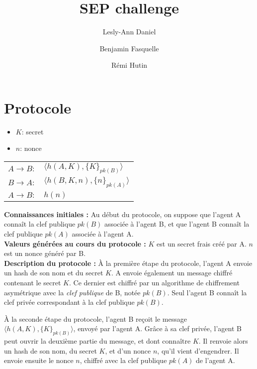 \documentclass[10pt,a4paper]{article}
\author{Lesly-Ann Daniel \and Benjamin Fasquelle \and Rémi Hutin}
\title{SEP challenge}
\begin{document}
\maketitle


\section{Protocole}

\begin{itemize}
\item $K$: secret
\item $n$: nonce
\end{itemize}

\begin{table}[!h]
\centering
\begin{tabular}{ll}
$A \rightarrow B:$ & $\langle h(A, K), \{K\}_{pk(B)} \rangle $ \\
$B \rightarrow A:$ & $\langle h(B, K, n), \{n\}_{pk(A)} \rangle $\\
$A \rightarrow B:$ & $h(n)$\\
\end{tabular}
\end{table}

\textbf{Connaissances initiales :} 
Au début du protocole, on suppose que l'agent A connaît la clef publique $pk(B)$ associée à l'agent B,
et que l'agent B connaît la clef publique $pk(A)$ associée à l'agent A. \\

\textbf{Valeurs générées au cours du protocole :} 
$K$ est un secret frais créé par A.
$n$ est un nonce généré par B.\\

\textbf{Description du protocole :}
À la première étape du protocole, l'agent A envoie un hash de son nom et du secret $K$. 
A envoie également un message chiffré contenant le secret $K$. 
Ce dernier est chiffré par un algorithme de chiffrement asymétrique avec la \emph{clef publique} de B, notée $pk(B)$.
Seul l'agent B connaît la clef privée correspondant à la clef publique $pk(B)$. 

À la seconde étape du protocole, l'agent B reçoit le message $\langle h(A, K), \{K\}_{pk(B)} \rangle $, envoyé par l'agent A.
Grâce à sa clef privée, l'agent B peut ouvrir la deuxième partie du message, et dont connaître $K$.
Il renvoie alors un hash de son nom, du secret $K$, et d'un nonce $n$, qu'il vient d'engendrer.
Il envoie ensuite le nonce $n$, chiffré avec la clef publique $pk(A)$ de l'agent A.
\end{document}
